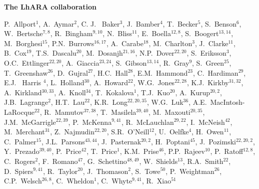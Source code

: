 \vspace{0.75cm}
\begin{center}
  {\bf \color{BlueViolet} The LhARA collaboration} \\
\end{center}
\vspace{0.50cm}
\begin{center}
  P.~Allport$^{1}$,
  A.~Aymar$^{2}$,
  C. J. ~Baker$^{3}$,
  J.~Bamber$^{4}$,
  T.~Becker$^{5}$,
  S.~Benson$^{6}$,
  W.~Bertsche$^{7,8}$,
  R.~Bingham$^{9,10}$,
  N.~Bliss$^{11}$,
  E.~Boella$^{12,8}$,
  S.~Boogert$^{13,14}$,
  M.~Borghesi$^{15}$,
  P.N.~Burrows$^{16,17}$,
  A.~Carabe$^{18}$,
  M.~Charlton$^{3}$,
  J.~Clarke$^{11}$,
  B.~Cox$^{19}$,
  T.S.~Dascalu$^{20}$,
  M.~Dosanjh$^{21,16}$,
  N.P.~Dover$^{22,20}$,
  S.~Eriksson$^{3}$,
  O.C.~Ettlinger$^{22,20}$,
  A.~Giaccia$^{23,24}$,
  S.~Gibson$^{13,14}$,
  R.~Gray$^{9}$,
  S.~Green$^{25}$,
  T.~Greenshaw$^{26}$,
  D.~Gujral$^{27}$,
  H.C.~Hall$^{28}$,
  E.M.~Hammond$^{23}$,
  C.~Hardiman$^{29}$,
  E.J. ~Harris $^{4}$,
  L.~Holland$^{30}$,
  A.~Howard$^{22}$,
  W.G.~Jones$^{22,28}$,
  K.J.~Kirkby$^{31,32}$,
  A.~Kirkland$^{30,33}$,
  A.~Knoll$^{34}$,
  T.~Kokalova$^{1}$,
  T.J.~Kuo$^{20}$,
  A.~Kurup$^{20,2}$,
  J.B.~Lagrange$^{2}$,
  H.T.~Lau$^{22}$,
  K.R.~Long$^{22,20,35}$,
  W.G.~Luk$^{36}$,
  A.E.~MacIntosh-LaRocque$^{22}$,
  R.~Mamutov$^{37,38}$,
  T.~Masilela$^{39,40}$,
  M.~Maxouti$^{20,35}$,
  J.M.~McGarrigle$^{22,39}$,
  P.~McKenna$^{9,41}$,
  R.~McLauchlan$^{29,22}$,
  I.~McNeish$^{42}$,
  M.~Merchant$^{31}$,
  Z.~Najmudin$^{22,20}$,
  S.R.~O'Neill$^{12}$,
  U.~Oelfke$^{4}$,
  H.~Owen$^{11}$,
  C.~Palmer$^{15}$,
  J.L.~Parsons$^{43,44}$,
  J.~Pasternak$^{20,2}$,
  H.~Poptani$^{45}$,
  J.~Pozimski$^{22,20,2}$,
  Y.~Prezado$^{39,40}$,
  P.~Price$^{42}$,
  T.~Price$^{1}$,
  K.M.~Prise$^{46}$,
  P.P.~Rajeev$^{10}$,
  P.~Ratoff$^{12,8}$,
  C.~Rogers$^{2}$,
  F.~Romano$^{47}$,
  G.~Schettino$^{48,49}$,
  W.~Shields$^{13}$,
  R.A.~Smith$^{22}$,
  D.~Spiers$^{9,41}$,
  R.~Taylor$^{20}$,
  J.~Thomason$^{2}$,
  S.~Towe$^{50}$,
  P.~Weightman$^{26}$,
  C.P.~Welsch$^{26,8}$,
  C.~Wheldon$^{1}$,
  C.~Whyte$^{9,41}$,
  R.~Xiao$^{51}$
\end{center}
\vspace{2.5cm}
